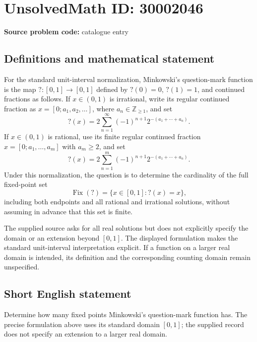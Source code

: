 \documentclass[11pt]{article}
\newcommand{\Z}{\mathbb{Z}}
\begin{document}
\section*{UnsolvedMath ID: 30002046}
\textbf{Source problem code:} catalogue entry
\subsection{Definitions and mathematical statement}
For the standard unit-interval normalization, Minkowski's question-mark function is the map \(\mathord{?}:[0,1]\to[0,1]\) defined by \(\mathord{?}(0)=0\), \(\mathord{?}(1)=1\), and continued fractions as follows. If \(x\in(0,1)\) is irrational, write its regular continued fraction as \(x=[0;a_1,a_2,\ldots]\), where \(a_n\in\Z_{\geq 1}\), and set
\[
\mathord{?}(x)=2\sum_{n=1}^{\infty}(-1)^{n+1}2^{-(a_1+\cdots+a_n)}.
\]
If \(x\in(0,1)\) is rational, use its finite regular continued fraction \(x=[0;a_1,\ldots,a_m]\) with \(a_m\geq2\), and set
\[
\mathord{?}(x)=2\sum_{n=1}^{m}(-1)^{n+1}2^{-(a_1+\cdots+a_n)}.
\]
Under this normalization, the question is to determine the cardinality of the full fixed-point set
\[
\operatorname{Fix}(\mathord{?})=\{x\in[0,1]:\mathord{?}(x)=x\},
\]
including both endpoints and all rational and irrational solutions, without assuming in advance that this set is finite.

The supplied source asks for all real solutions but does not explicitly specify the domain or an extension beyond \([0,1]\). The displayed formulation makes the standard unit-interval interpretation explicit. If a function on a larger real domain is intended, its definition and the corresponding counting domain remain unspecified.
\subsection{Short English statement}
Determine how many fixed points Minkowski's question-mark function has. The precise formulation above uses its standard domain \([0,1]\); the supplied record does not specify an extension to a larger real domain.
\end{document}

